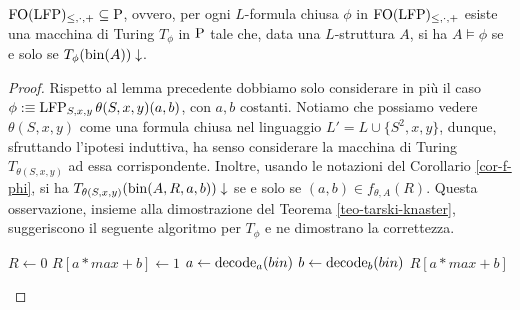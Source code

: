 \begin{proposizione}
\label{prop:FO(LFP)-subset-P}
 $\FOLFP \subseteq \P$, ovvero, per ogni $L$-formula chiusa $\phi$ in $\FOLFP$ esiste
 una macchina di Turing $T_\phi$ in $\P$ tale che, data una $L$-struttura $A$,
 si ha $A \models \phi$ se e solo se $T_\phi(\bin(A))\downarrow$.
\end{proposizione}
\begin{proof}
  Rispetto al lemma precedente dobbiamo solo considerare in più il caso
  $\phi :\equiv \LFP_{S,x,y}\theta(S,x,y)(a,b)$, con $a, b$ costanti.
  Notiamo che possiamo vedere
  $\theta(S,x,y)$ come una formula chiusa nel linguaggio $L'=L \cup \{S^2,x,y\}$,
  dunque, sfruttando l'ipotesi induttiva, ha senso considerare la macchina di
  Turing $T_{\theta(S,x,y)}$ ad essa
  corrispondente. Inoltre, usando le notazioni del Corollario \ref{cor-f-phi},
  si ha $T_{\theta(S,x,y)}(\bin(A,R,a,b))\downarrow$
  se e solo se $(a,b) \in f_{\theta,A}(R)$. Questa osservazione, insieme alla
  dimostrazione del Teorema \ref{teo-tarski-knaster}, suggeriscono il seguente
  algoritmo per $T_\phi$ e ne dimostrano la correttezza.
  
  \begin{algorithmic}
    \State $R\gets 0$
	\State $R[a*max + b] \gets 1$
      \EndIf
      \EndFor
    \EndFor
    \State $a \gets \decode_a (bin)$
    \State $b \gets \decode_b (bin)$
    \State \Return $R[a*max + b]$
  \EndFunction
  \end{algorithmic}
\end{proof}

